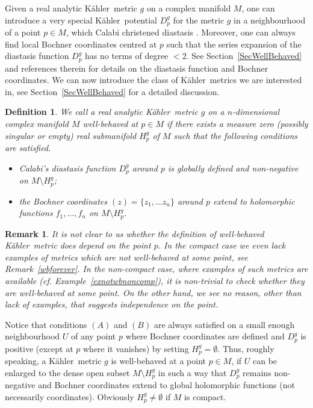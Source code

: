 \documentclass[12pt]{amsart}
\newcommand{\K}{K\"{a}hler}
\newtheorem{defin}{Definition}
\newtheorem{remark}{Remark}
\begin{document}
Given a real analytic \K\ metric $g$ on a complex manifold $M$, one can introduce a very special \K\ potential $D^g_p$ for the metric $g$ in  a neighbourhood of a point  $p\in M$, which Calabi christened diastasis \cite{Calabi53Isometric}.
Moreover, one can always find local Bochner coordinates 
centred at $p$
such that the series expansion of the diastasis function $D^g_p$ has no terms of degree $<2$. See Section~\ref{SecWellBehaved} and references therein for details on the diastasis function and Bochner coordinates.
We can now introduce the class of \K\ metrics we are interested in, see Section~\ref{SecWellBehaved} for a detailed discussion.
\begin{defin}\label{defWB}\rm
	We call a real analytic  \K\ metric $g$ on a $n$-dimensional complex manifold $M$ {\em well-behaved at $p\in M$} if there exists  a measure zero (possibly singular or empty) real submanifold $H_p^g$ of $M$ such that the following conditions are satisfied.
	\begin{itemize}
		\item [$(A)$]
		Calabi's diastasis function $D^g_p$ around $p$ is globally defined and non-negative on $M\setminus H_p^g$;
		\item [$(B)$]
		the Bochner coordinates  $(z)=\{z_1, \dots z_n\}$ around $p$ extend to holomorphic functions $f_1, \dots , f_n$ on $M\setminus H_p^g$.
	\end{itemize}
\end{defin}

\begin{remark}\rm\label{rmkPointDependence}
	It is not clear to us whether the definition of well-behaved \K\  metric does depend on the point $p$. 
	In the compact case we even lack examples of metrics which are not well-behaved at some point, see Remark~\ref{wbforever}.
	In the non-compact case, where examples of such metrics are available (cf. Example~\ref{exnotwbnoncomp}), it is non-trivial to check whether they are well-behaved at some point.
	On the other hand, we see no reason, other than lack of examples, that suggests independence on the point.
\end{remark}



	Notice that conditions $(A)$ and $(B)$ are  always satisfied on a small enough neighbourhood $U$ of any point $p$ where Bochner coordinates are defined and $D_p^g$ is positive (except at $p$ where it vanishes) by setting  $H_p^g=\emptyset$. Thus, roughly speaking, a \K\ metric $g$ is well-behaved  at a   point  $p\in M$, if  $U$ can be enlarged to the dense open  subset  $M\setminus H_p^g$  
	in such a way that   $D_p^g$ remains non-negative and  Bochner coordinates extend to global  holomorphic functions (not necessarily coordinates).
	Obviously $H_p^g\neq\emptyset$ if $M$ is compact.
\end{document}
